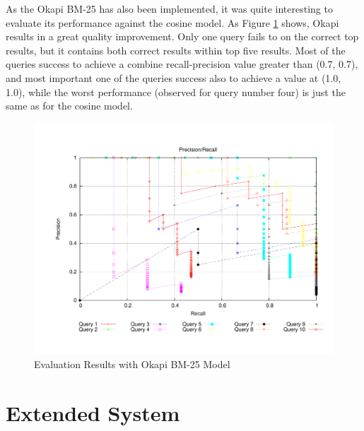 As the Okapi BM-25 has also been implemented, it was quite interesting to evaluate its performance against the cosine model. As Figure \ref{fig:okapi} shows, Okapi results in a great quality improvement. Only one query fails to on the correct top results, but it contains both correct results within top five results. Most of the queries success to achieve a combine recall-precision value greater than (0.7, 0.7), and most important one of the queries success also to achieve a value at (1.0, 1.0), while the worst performance (observed for query number four) is just the same as for the cosine model.

\begin{figure}
\includegraphics[width=1.0\textwidth]{include/bench_okapi}
\caption{Evaluation Results with Okapi BM-25 Model}
\label{fig:okapi}
\end{figure}

\section{Extended System}